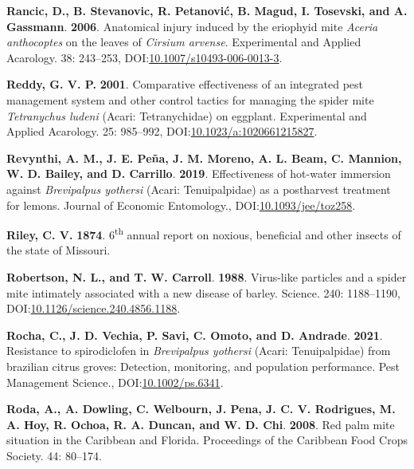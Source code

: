 \documentclass[12pt,final,CPage]{ufthesis}
\newlength{\cslhangindent}
\newenvironment{CSLReferences}[2] %
{%
	\setlength{\parindent}{0pt}
	\ifodd #1 \everypar{\setlength{\hangindent}{\cslhangindent}}\ignorespaces\fi
	\ifnum #2 > 0
	\setlength{\parskip}{#2\baselineskip}
	\fi
}%
{}
\begin{document}
{\begin{CSLReferences}{1}{0}
  \leavevmode{}%
  \textbf{Rancic, D., B. Stevanovic, R. Petanović, B. Magud, I. Tosevski, and A. Gassmann}. \textbf{2006}. Anatomical injury induced by the eriophyid mite {\emph{Aceria anthocoptes}} on the leaves of {\emph{Cirsium arvense}}. Experimental and Applied Acarology. 38: 243--253, DOI:\href{https://doi.org/10.1007/s10493-006-0013-3}{10.1007/s10493-006-0013-3}.

  \leavevmode{}%
  \textbf{Reddy, G. V. P.} \textbf{2001}. Comparative effectiveness of an integrated pest management system and other control tactics for managing the spider mite {\emph{Tetranychus ludeni}} {(Acari: Tetranychidae)} on eggplant. Experimental and Applied Acarology. 25: 985--992, DOI:\href{https://doi.org/10.1023/a:1020661215827}{10.1023/a:1020661215827}.

  \leavevmode{}%
  \textbf{Revynthi, A. M., J. E. Peña, J. M. Moreno, A. L. Beam, C. Mannion, W. D. Bailey, and D. Carrillo}. \textbf{2019}. Effectiveness of hot-water immersion against {\emph{Brevipalpus yothersi}} ({Acari}: {Tenuipalpidae}) as a postharvest treatment for lemons. Journal of Economic Entomology., DOI:\href{https://doi.org/10.1093/jee/toz258}{10.1093/jee/toz258}.

  \leavevmode{}%
  \textbf{Riley, C. V.} \textbf{1874}. 6\textsuperscript{th} annual report on noxious, beneficial and other insects of the state of {Missouri}.

  \leavevmode{}%
  \textbf{Robertson, N. L., and T. W. Carroll}. \textbf{1988}. Virus-like particles and a spider mite intimately associated with a new disease of barley. Science. 240: 1188--1190, DOI:\href{https://doi.org/10.1126/science.240.4856.1188}{10.1126/science.240.4856.1188}.

  \leavevmode{}%
  \textbf{Rocha, C., J. D. Vechia, P. Savi, C. Omoto, and D. Andrade}. \textbf{2021}. Resistance to spirodiclofen in {\emph{Brevipalpus yothersi}} ({Acari}: {Tenuipalpidae}) from brazilian citrus groves: Detection, monitoring, and population performance. Pest Management Science., DOI:\href{https://doi.org/10.1002/ps.6341}{10.1002/ps.6341}.

  \leavevmode{}%
  \textbf{Roda, A., A. Dowling, C. Welbourn, J. Pena, J. C. V. Rodrigues, M. A. Hoy, R. Ochoa, R. A. Duncan, and W. D. Chi}. \textbf{2008}. Red palm mite situation in the {Caribbean} and {Florida}. Proceedings of the Caribbean Food Crops Society. 44: 80--174.


\end{CSLReferences}}
\end{document}
